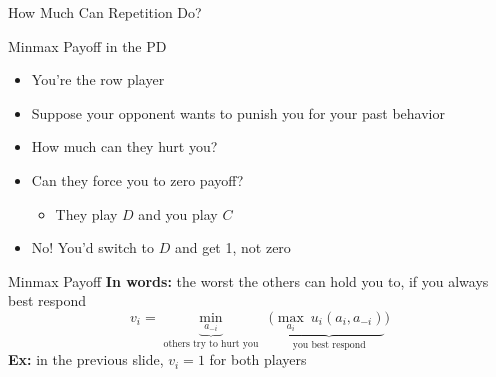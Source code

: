 \begin{frame}[standout]
How Much Can Repetition Do?
\end{frame}

\begin{frame}{Minmax Payoff in the PD}
\centering
\begin{matrixgame}[top={Cooperate, Defect}, left={Cooperate, Defect}]
\end{matrixgame}
\raggedright
\begin{itemize}
    \item You're the row player
    \item Suppose your opponent wants to punish you for your past behavior
    \item<2-> How much can they hurt you?
    \item<3-> Can they force you to zero payoff?
    \begin{itemize}
        \item They play $D$ and you play $C$
    \end{itemize}
    \item<4-> No! You'd switch to $D$ and get 1, not zero
\end{itemize}
\bsk
{}
\bsk
{}
\end{frame}

\begin{frame}{Minmax Payoff}
\textbf{In words:} the worst the others can hold you to, if you always best respond
$$v_i=\underbrace{\min_{a_{-i}}}_{\text{others try to hurt you}}\ \ \big(\underbrace{\max_{a_i}\ u_i(a_i,a_{-i})}_{\text{you best respond}}\big)$$
\bsk
\textbf{Ex:} in the previous slide, $v_i=1$ for both players
\bsk
{}
\end{frame}

